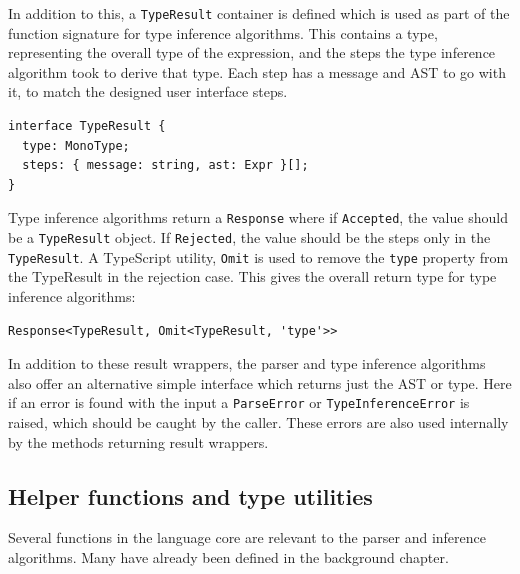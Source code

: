 \documentclass[a4paper,fleqn,oneside,12pt]{report}
\begin{document}
In addition to this, a \texttt{TypeResult} container is defined which is used as part of the function signature for type inference algorithms. This contains a type, representing the overall type of the expression, and the steps the type inference algorithm took to derive that type. Each step has a message and AST to go with it, to match the designed user interface steps.

\begin{verbatim}
interface TypeResult {
  type: MonoType;
  steps: { message: string, ast: Expr }[];
}
\end{verbatim}

Type inference algorithms return a \texttt{Response} where if \texttt{Accepted}, the value should be a \texttt{TypeResult} object. If \texttt{Rejected}, the value should be the steps only in the \texttt{TypeResult}. A TypeScript utility, \texttt{Omit} is used to remove the \texttt{type} property from the TypeResult in the rejection case. This gives the overall return type for type inference algorithms:

\begin{verbatim}
Response<TypeResult, Omit<TypeResult, 'type'>>
\end{verbatim}
In addition to these result wrappers, the parser and type inference algorithms also offer an alternative simple interface which returns just the AST or type. Here if an error is found with the input a \texttt{ParseError} or \texttt{TypeInferenceError} is raised, which should be caught by the caller. These errors are also used internally by the methods returning result wrappers.

\subsection{Helper functions and type utilities}\label{id:h.sw77qek8b49p}

Several functions in the language core are relevant to the parser and inference algorithms. Many have already been defined in the background chapter.
\end{document}
